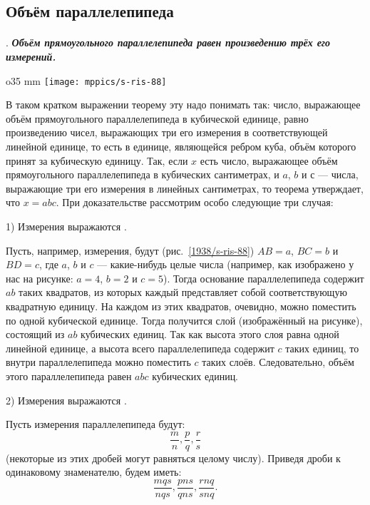 \subsection*{Объём параллелепипеда}

\paragraph{}\label{1938/s84}
.
\textbf{\emph{Объём прямоугольного параллелепипеда равен произведению трёх его измерений.}}

\begin{wrapfigure}{o}{35 mm}
\vskip-0mm
\centering
\texttt{[image: mppics/s-ris-88]}
\caption{}\label{1938/s-ris-88}
\vskip-0mm
\end{wrapfigure}

В таком кратком выражении теорему эту надо понимать так: число, выражающее объём прямоугольного параллелепипеда в кубической единице, равно произведению чисел, выражающих три его измерения в соответствующей линейной единице, то есть в единице, являющейся ребром куба, объём которого принят за кубическую единицу.
Так, если $x$ есть число, выражающее объём прямоугольного параллелепипеда в кубических сантиметрах, и $a$, $b$ и с — числа, выражающие три его измерения в линейных сантиметрах, то теорема утверждает, что $x=abc$.
При доказательстве рассмотрим особо следующие три случая:


1) Измерения выражаются .

Пусть, например, измерения, будут (рис.~\ref{1938/s-ris-88}) $AB=a$, $BC=b$ и $BD=c$, где $a$, $b$ и $c$ — какие-нибудь целые числа (например, как изображено у нас на рисунке: $a=4$, $b=2$ и $c=5$).
Тогда основание параллелепипеда содержит $ab$ таких квадратов, из которых каждый представляет собой соответствующую квадратную единицу.
На каждом из этих квадратов, очевидно, можно поместить по одной кубической единице.
Тогда получится слой (изображённый на рисунке), состоящий из $ab$ кубических единиц.
Так как высота этого слоя равна одной линейной единице, а высота всего параллелепипеда содержит $c$ таких единиц, то внутри параллелепипеда можно поместить $c$ таких слоёв.
Следовательно, объём этого параллелепипеда равен $abc$ кубических единиц.

2) Измерения выражаются .

Пусть измерения параллелепипеда будут:
\[\frac mn, \frac pq, \frac rs\]
(некоторые из этих дробей могут равняться целому числу).
Приведя дроби к одинаковому знаменателю, будем иметь:
\[\frac {mqs}{nqs}, \frac {pns}{qns}, \frac {rnq}{snq}.\]

